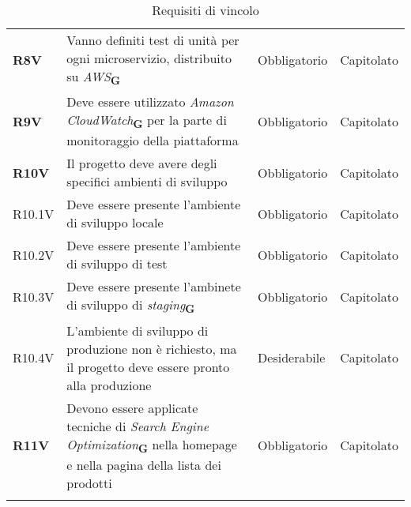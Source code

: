 \begin{center}
\begin{longtable}[!h]{p{50px} p{200px} p{100px} p{50px}}
        \textbf{R8V}                          & Vanno definiti test di unità per ogni microservizio, distribuito su \textit{AWS}\textsubscript{\textbf{G}}                                             & Obbligatorio             & Capitolato     \\
        \textbf{R9V}                          & Deve essere utilizzato \textit{Amazon CloudWatch}\textsubscript{\textbf{G}} per la parte di monitoraggio della piattaforma                             & Obbligatorio             & Capitolato     \\
        \textbf{R10V}                         & Il progetto deve avere degli specifici ambienti di sviluppo                                                                                            & Obbligatorio             & Capitolato     \\
        R10.1V                                & Deve essere presente l'ambiente di sviluppo locale                                                                                                     & Obbligatorio             & Capitolato     \\
        R10.2V                                & Deve essere presente l'ambiente di sviluppo di test                                                                                                    & Obbligatorio             & Capitolato     \\
        R10.3V                                & Deve essere presente l'ambinete di sviluppo di \textit{staging}\textsubscript{\textbf{G}}                                                              & Obbligatorio             & Capitolato     \\
        R10.4V                                & L'ambiente di sviluppo di produzione non è richiesto, ma il progetto deve essere pronto alla produzione                                                & Desiderabile             & Capitolato     \\
        \textbf{R11V}                         & Devono essere applicate tecniche di \textit{Search Engine Optimization}\textsubscript{\textbf{G}} nella homepage e nella pagina della lista dei prodotti & Obbligatorio & Capitolato \\
        \rowcolor{white}\caption{Requisiti di vincolo}
    \end{longtable}
\end{center}

\newpage
